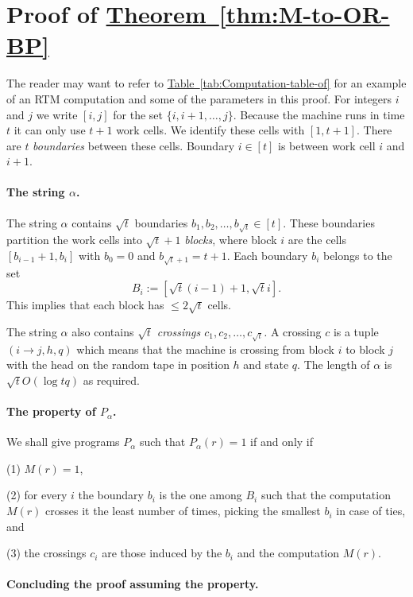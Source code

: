 \documentclass[11pt]{article}
\numberwithin{equation}{section}
\theoremstyle{definition}
\theoremstyle{plain}
\newcommand{\expref}[2]{\hyperref[#2]{#1~\ref{#2}}}
\begin{document}
\section{Proof of \expref{Theorem}{thm:M-to-OR-BP} \label{sec:Proof-of-simu}}
%

The reader may want to refer to \expref{Table}{tab:Computation-table-of}
for an example of an RTM computation and some of the parameters in
this proof. For integers $i$ and $j$ we write $[i,j]$ for the set
$\{i,i+1,\ldots,j\}$. Because the machine runs in time $t$ it can
only use $t+1$ work cells. We identify these cells with $[1,t+1]$.
There are $t$ \emph{boundaries} between these cells. Boundary $i\in[t]$
is between work cell $i$ and $i+1$.

\paragraph{The string $\alpha$.}

The string $\alpha$ contains $\sqrt{t}$ boundaries $b_{1},b_{2},\ldots,b_{\sqrt{t}}\in[t]$.
These boundaries partition the work cells into $\sqrt{t}+1$\emph{
blocks}, where block $i$ are the cells $[b_{i-1}+1,b_{i}]$ with
$b_{0}=0$ and $b_{\sqrt{t}+1}=t+1$. Each boundary $b_{i}$ belongs
to the set 
\[
B_{i}:=[\sqrt{t}(i-1)+1,\sqrt{t}i].
\]
This implies that each block has $\le2\sqrt{t}$ cells.

The string $\alpha$ also contains $\sqrt{t}$ \emph{crossings $c_{1},c_{2},\ldots,c_{\sqrt{t}}$.}
A crossing $c$ is a tuple $(i\to j,h,q)$ which means that the machine
is crossing from block $i$ to block $j$ with the head on the random
tape in position $h$ and state $q$. The length of $\alpha$ 
is $\sqrt{t}O(\log tq)$ as required.

\paragraph{The property of $P_{\alpha}$.}

We shall give programs $P_{\alpha}$ such that $P_{\alpha}(r)=1$
if and only if

(1) $M(r)=1$,

(2) for every $i$ the boundary $b_{i}$ is the one among $B_{i}$
such that the computation $M(r)$ crosses it the least number of times,
picking the smallest $b_{i}$ in case of ties, and

(3) the crossings $c_{i}$ are those induced by the $b_{i}$ and the
computation $M(r)$.

\paragraph{Concluding the proof assuming the property.}
\end{document}
